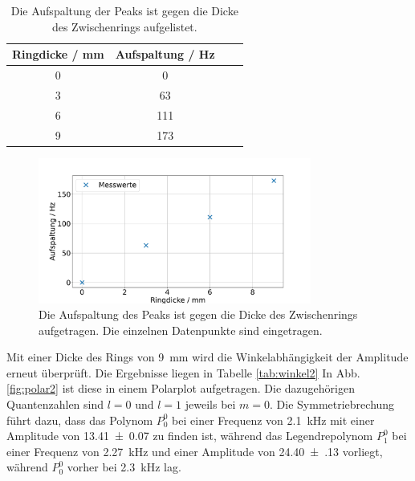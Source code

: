 \begin{table}\caption{Die Aufspaltung der Peaks ist gegen die Dicke des Zwischenrings aufgelistet.}
    \label{tab:aufspaltung}
    \centering
     \begin{tabular}{c c S[round-precision=1] c} 
    \toprule
{Ringdicke / \si{\milli\metre}} & {Aufspaltung / \si{\hertz}}  \\
 & 0 \\
3 & 63 \\
6 & 111 \\
9 & 173 \\
\bottomrule
\end{tabular}\end{table}

\begin{figure}
    \centering
    \includegraphics[width=0.8\textwidth]{plots/C_Aufspaltung.pdf}
    \caption{Die Aufspaltung des Peaks ist gegen die Dicke des Zwischenrings aufgetragen. Die einzelnen Datenpunkte sind eingetragen.}
    \label{fig:aufspaltung}
\end{figure}

Mit einer Dicke des Rings von \SI{9}{\milli\meter} wird die Winkelabhängigkeit der Amplitude erneut überprüft. Die Ergebnisse liegen in Tabelle \ref{tab:winkel2}
In Abb. \ref{fig:polar2} ist diese in einem Polarplot aufgetragen. Die dazugehörigen Quantenzahlen sind $l = 0$ und $l=1$ jeweils bei $ m = 0$. 
Die Symmetriebrechung führt dazu, dass das Polynom $P^0_0$ bei einer Frequenz von \SI{2.1}{\kilo\hertz} mit einer Amplitude von \num{13.41(7)} zu finden ist, während das Legendrepolynom $P^0_1$ bei einer Frequenz von \SI{2.27}{\kilo\hertz} und einer Amplitude von \num{24.40(13)} vorliegt, während $P^0_0$ vorher bei \SI{2.3}{\kilo\hertz} lag.

